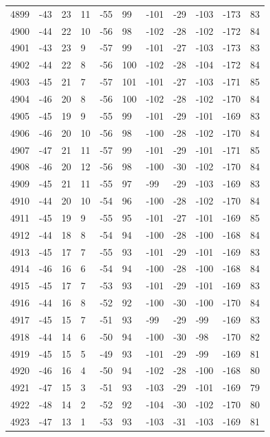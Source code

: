 \begin{table}[H]
\begin{tabular}{lllllllllll}
4899 & -43 & 23 & 11 & -55 & 99 & -101 & -29 & -103 & -173 & 83 \\
4900 & -44 & 22 & 10 & -56 & 98 & -102 & -28 & -102 & -172 & 84 \\
4901 & -43 & 23 & 9 & -57 & 99 & -101 & -27 & -103 & -173 & 83 \\
4902 & -44 & 22 & 8 & -56 & 100 & -102 & -28 & -104 & -172 & 84 \\
4903 & -45 & 21 & 7 & -57 & 101 & -101 & -27 & -103 & -171 & 85 \\
4904 & -46 & 20 & 8 & -56 & 100 & -102 & -28 & -102 & -170 & 84 \\
4905 & -45 & 19 & 9 & -55 & 99 & -101 & -29 & -101 & -169 & 83 \\
4906 & -46 & 20 & 10 & -56 & 98 & -100 & -28 & -102 & -170 & 84 \\
4907 & -47 & 21 & 11 & -57 & 99 & -101 & -29 & -101 & -171 & 85 \\
4908 & -46 & 20 & 12 & -56 & 98 & -100 & -30 & -102 & -170 & 84 \\
4909 & -45 & 21 & 11 & -55 & 97 & -99 & -29 & -103 & -169 & 83 \\
4910 & -44 & 20 & 10 & -54 & 96 & -100 & -28 & -102 & -170 & 84 \\
4911 & -45 & 19 & 9 & -55 & 95 & -101 & -27 & -101 & -169 & 85 \\
4912 & -44 & 18 & 8 & -54 & 94 & -100 & -28 & -100 & -168 & 84 \\
4913 & -45 & 17 & 7 & -55 & 93 & -101 & -29 & -101 & -169 & 83 \\
4914 & -46 & 16 & 6 & -54 & 94 & -100 & -28 & -100 & -168 & 84 \\
4915 & -45 & 17 & 7 & -53 & 93 & -101 & -29 & -101 & -169 & 83 \\
4916 & -44 & 16 & 8 & -52 & 92 & -100 & -30 & -100 & -170 & 84 \\
4917 & -45 & 15 & 7 & -51 & 93 & -99 & -29 & -99 & -169 & 83 \\
4918 & -44 & 14 & 6 & -50 & 94 & -100 & -30 & -98 & -170 & 82 \\
4919 & -45 & 15 & 5 & -49 & 93 & -101 & -29 & -99 & -169 & 81 \\
4920 & -46 & 16 & 4 & -50 & 94 & -102 & -28 & -100 & -168 & 80 \\
4921 & -47 & 15 & 3 & -51 & 93 & -103 & -29 & -101 & -169 & 79 \\
4922 & -48 & 14 & 2 & -52 & 92 & -104 & -30 & -102 & -170 & 80 \\
4923 & -47 & 13 & 1 & -53 & 93 & -103 & -31 & -103 & -169 & 81 \\

\end{tabular}
\end{table}
